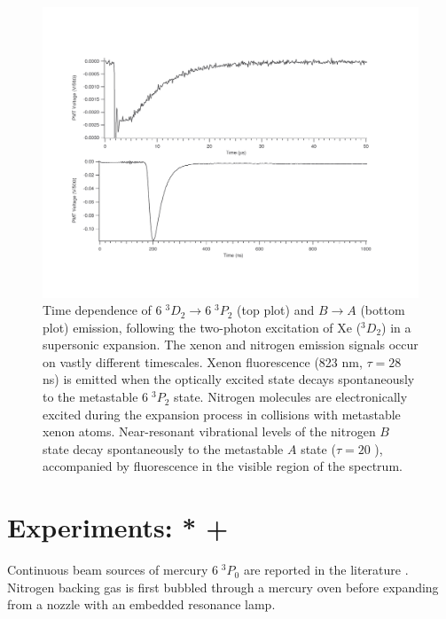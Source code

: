 \documentclass[12pt]{mitthesis}
\begin{document}
\begin{figure}
  \caption{Time dependence of  $6\;^3D_2 \rightarrow 6\;^3P_2$
    (top plot) and  $B \rightarrow A$ (bottom plot) emission,
    following the two-photon excitation of Xe ($^3D_2$) in a
    supersonic expansion.  The xenon and nitrogen emission signals
    occur on vastly different timescales.  Xenon fluorescence (823 nm,
    $\tau=28$ ns) is emitted when the optically excited state decays
    spontaneously to the metastable $6\;^3P_2$ state.  Nitrogen
    molecules are electronically excited during the expansion process
    in collisions with metastable xenon atoms.  Near-resonant
    vibrational levels of the nitrogen $B$ state decay spontaneously
    to the metastable $A$ state ($\tau=20$ \microsec), accompanied by
    fluorescence in the visible region of the spectrum. }
  \label{fig:xen2-traces}
  \centering
  \includegraphics[width=7.7in,angle=90,trim=0 0 1in 1cm ]{XeN2-traces.pdf}
\end{figure}



\section{Experiments: * + }

Continuous beam sources of mercury $6 \; ^3P_0$ are reported in the
literature \cite{haberman75, obi83}.  Nitrogen backing gas is first
bubbled through a mercury oven before expanding from a nozzle with an
embedded resonance lamp.
\end{document}
